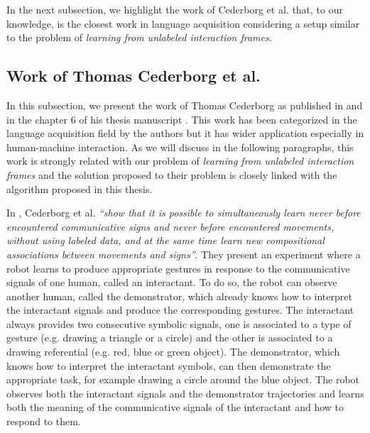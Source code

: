 In the next subsection, we highlight the work of Cederborg et al. \cite{cederborg2011imitating} that, to our knowledge, is the closest work in language acquisition considering a setup similar to the problem of \emph{learning from unlabeled interaction frames}. 


\subsection{Work of Thomas Cederborg et al.}
\label{chapter:related:language:thomas}

In this subsection, we present the work of Thomas Cederborg as published in \cite{cederborg2011imitating,cederborg2013language} and in the chapter 6 of his thesis manuscript \cite{cederborg2014thesis}. This work has been categorized in the language acquisition field by the authors but it has wider application especially in human-machine interaction. As we will discuss in the following paragraphs, this work is strongly related with our problem of \emph{learning from unlabeled interaction frames} and the solution proposed to their problem is closely linked with the algorithm proposed in this thesis.

In \cite{cederborg2011imitating}, Cederborg et al. \textit{``show that it is possible to simultaneously learn never before encountered communicative signs and never before encountered movements, without using labeled data, and at the same time learn new compositional associations between movements and signs''}. They present an experiment where a robot learns to produce appropriate gestures in response to the communicative signals of one human, called an interactant. To do so, the robot can observe another human, called the demonstrator, which already knows how to interpret the interactant signals and produce the corresponding gestures. The interactant always provides two consecutive symbolic signals, one is associated to a type of gesture (e.g. drawing a triangle or a circle) and the other is associated to a drawing referential (e.g. red, blue or green object). The demonstrator, which knows how to interpret the interactant symbols, can then demonstrate the appropriate task, for example drawing a circle around the blue object. The robot observes both the interactant signals and the demonstrator trajectories and learns both the meaning of the communicative signals of the interactant and how to respond to them.

